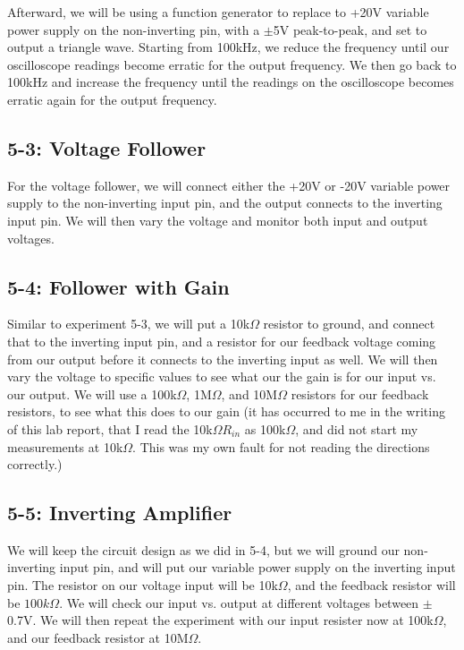 \documentclass[%
 aip,
 jmp,
 amsmath,
 amssymb,
 reprint,%
 numerical,
 longbibliography,
]{revtex4-1}
\begin{document}
	Afterward, we will be using a function generator to replace to +20V variable power supply on the non-inverting pin, with a $\pm$5V
	peak-to-peak, and set to output a triangle wave. Starting from 100kHz, we reduce the frequency until our oscilloscope
	readings become erratic for the output frequency. We then go back to 100kHz and increase the frequency until 
	the readings on the oscilloscope becomes erratic again for the output frequency.
	
	\subsection{5-3: Voltage Follower}
	
	For the voltage follower, we will connect either the +20V or -20V variable power supply to the non-inverting input pin, and the output
	connects to the inverting input pin. We will then vary the voltage and monitor both input and output voltages.
	
	\subsection{5-4: Follower with Gain}
	
	Similar to experiment 5-3, we will put a 10k$\Omega$ resistor to ground, and connect that to the inverting input pin, and a resistor 
	for our feedback voltage coming from our output before it connects to the inverting input as well. We will then vary the voltage to
	specific values to see what our the gain is for our input vs. our output. We will use a 100k$\Omega$, 1M$\Omega$, and 10M$\Omega$ resistors
	for our feedback resistors, to see what this does to our gain (it has occurred to me in the writing of this lab report, that I read the 
	10k$\Omega R_{in}$ as 100k$\Omega$, and did not start my measurements at 10k$\Omega$. This was my own fault for not reading the directions
	correctly.)
	
	\subsection{5-5: Inverting Amplifier}
	
	We will keep the circuit design as we did in 5-4, but we will ground our non-inverting input pin, and will put our variable power supply on the inverting
	input pin. The resistor on our voltage input will be 10k$\Omega$, and the feedback resistor will be $100k\Omega$. We will check our input vs.
	output at different voltages between $\pm$0.7V. We will then repeat the experiment with our input resister now at 100k$\Omega$, and our feedback resistor
	at 10M$\Omega$.
	
\end{document}
